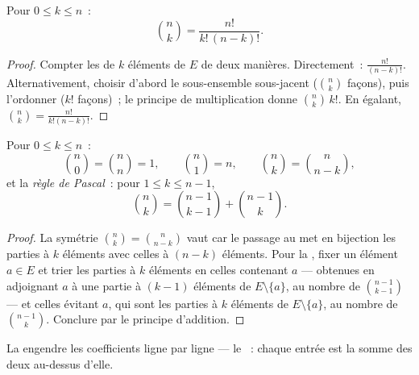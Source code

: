 \begin{theorem}\label{thm:g12:comb:binomformula}
Pour $0 \leq k \leq n$~:
\[
\binom{n}{k} = \frac{n!}{k!\,(n-k)!} .
\]
\end{theorem}

\begin{proof}
Compter les  de $k$ éléments de $E$ de deux manières.
Directement~: $\frac{n!}{(n-k)!}$. Alternativement, choisir d'abord le
sous-ensemble sous-jacent ($\binom nk$ façons), puis l'ordonner ($k!$
façons)~; le principe de multiplication donne $\binom{n}{k}\,k!$. En
égalant, $\binom nk = \frac{n!}{k!(n-k)!}$.
\end{proof}

\begin{proposition}\label{prop:g12:comb:identities}
Pour $0 \leq k \leq n$~:
\[
\binom{n}{0} = \binom{n}{n} = 1, \qquad
\binom{n}{1} = n, \qquad
\binom{n}{k} = \binom{n}{n-k},
\]
et la \emph{règle de Pascal}~: pour
$1 \leq k \leq n-1$,
\[
\binom{n}{k} = \binom{n-1}{k-1} + \binom{n-1}{k}.
\]
\end{proposition}

\begin{proof}
La symétrie $\binom nk = \binom{n}{n-k}$ vaut car le passage au
 met en bijection les parties à $k$ éléments avec celles à
$(n-k)$ éléments. Pour la , fixer un élément $a \in E$ et
trier les parties à $k$ éléments en celles contenant $a$ --- obtenues en
adjoignant $a$ à une partie à $(k-1)$ éléments de $E \setminus \{a\}$, au
nombre de $\binom{n-1}{k-1}$ --- et celles évitant $a$, qui sont les
parties à $k$ éléments de $E \setminus \{a\}$, au nombre de
$\binom{n-1}{k}$. Conclure par le principe d'addition.
\end{proof}

La  engendre les coefficients ligne par ligne --- le
\emph{}~: chaque entrée est la somme des deux au-dessus
d'elle.


